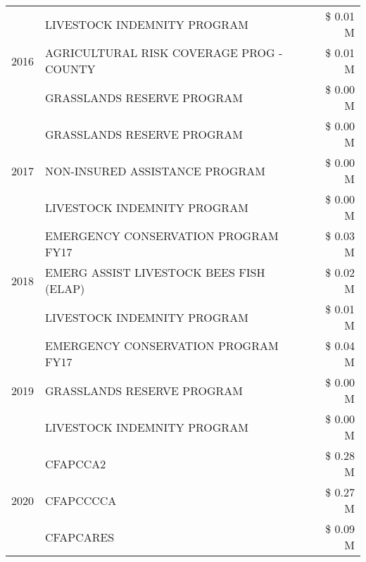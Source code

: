 \begin{tabular}{llr}
\cline{1-3}
\multirow[t]{3}{*}{2016} & LIVESTOCK INDEMNITY PROGRAM & \$ 0.01 M \\
 & AGRICULTURAL RISK COVERAGE PROG - COUNTY & \$ 0.01 M \\
 & GRASSLANDS RESERVE PROGRAM & \$ 0.00 M \\
\cline{1-3}
\multirow[t]{3}{*}{2017} & GRASSLANDS RESERVE PROGRAM & \$ 0.00 M \\
 & NON-INSURED ASSISTANCE PROGRAM & \$ 0.00 M \\
 & LIVESTOCK INDEMNITY PROGRAM & \$ 0.00 M \\
\cline{1-3}
\multirow[t]{3}{*}{2018} & EMERGENCY CONSERVATION PROGRAM FY17 & \$ 0.03 M \\
 & EMERG ASSIST LIVESTOCK BEES FISH (ELAP) & \$ 0.02 M \\
 & LIVESTOCK INDEMNITY PROGRAM & \$ 0.01 M \\
\cline{1-3}
\multirow[t]{3}{*}{2019} & EMERGENCY CONSERVATION PROGRAM FY17 & \$ 0.04 M \\
 & GRASSLANDS RESERVE PROGRAM & \$ 0.00 M \\
 & LIVESTOCK INDEMNITY PROGRAM & \$ 0.00 M \\
\cline{1-3}
\multirow[t]{3}{*}{2020} & CFAPCCA2 & \$ 0.28 M \\
 & CFAPCCCCA & \$ 0.27 M \\
 & CFAPCARES & \$ 0.09 M \\
\cline{1-3}
\bottomrule
\end{tabular}
